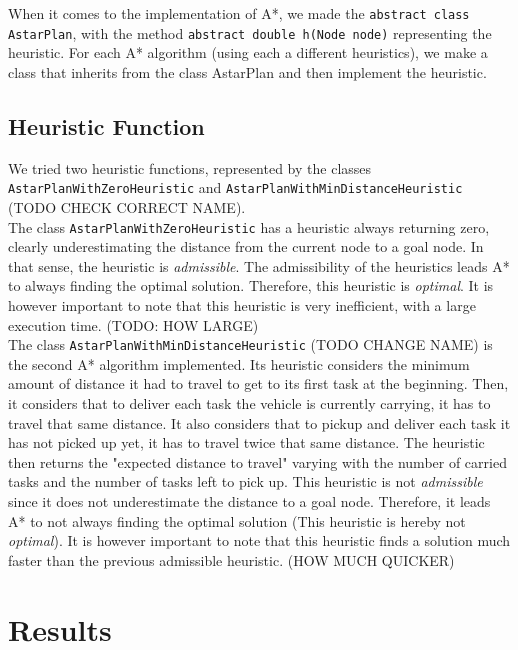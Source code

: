 \documentclass[11pt]{article}
\begin{document}
When it comes to the implementation of A*, we made the \texttt{abstract class AstarPlan}, with the method \texttt{abstract double h(Node node)} representing the heuristic. For each A* algorithm (using each a different heuristics), we make a class that inherits from\textsl{} the class AstarPlan and then implement the heuristic. 

\subsection{Heuristic Function}
We tried two heuristic functions, represented by the classes \texttt{AstarPlanWithZeroHeuristic} and \texttt{AstarPlanWithMinDistanceHeuristic} (TODO CHECK CORRECT NAME).\\

The class \texttt{AstarPlanWithZeroHeuristic} has a heuristic always returning zero, clearly underestimating the distance from the current node to a goal node. In that sense, the heuristic is \textit{admissible}. The admissibility of the heuristics leads A* to always finding the optimal solution. Therefore, this heuristic is \textit{optimal}. It is however important to note that this heuristic is very inefficient, with a large execution time. (TODO: HOW LARGE)\\

The class \texttt{AstarPlanWithMinDistanceHeuristic} (TODO CHANGE NAME) is the second A* algorithm implemented. Its heuristic considers the minimum amount of distance it had to travel to get to its first task at the beginning. Then, it considers that to deliver each task the vehicle is currently carrying, it has to travel that same distance. It also considers that to pickup and deliver each task it has not picked up yet, it has to travel twice that same distance. The heuristic then returns the "expected distance to travel" varying with the number of carried tasks and the number of tasks left to pick up. This heuristic is not \textit{admissible} since it does not underestimate the distance to a goal node. Therefore, it leads A* to not always finding the optimal solution (This heuristic is hereby not \textit{optimal}). It is however important to note that this heuristic finds a solution much faster than the previous admissible heuristic. (HOW MUCH QUICKER) 

\section{Results}
\end{document}
